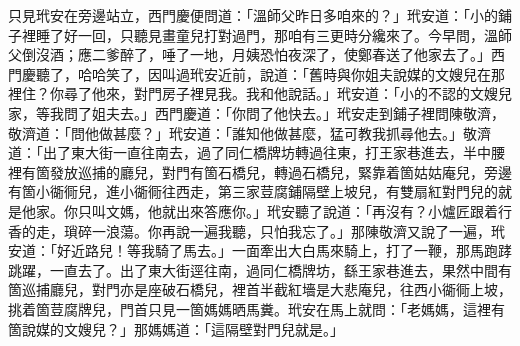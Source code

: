 只見玳安在旁邊站立，西門慶便問道：「溫師父昨日多咱來的？」玳安道：「小的鋪子裡睡了好一回，只聽見畫童兒打對過門，那咱有三更時分纔來了。今早問，溫師父倒沒酒；應二爹醉了，唾了一地，月姨恐怕夜深了，使鄭春送了他家去了。」西門慶聽了，哈哈笑了，因叫過玳安近前，說道：「舊時與你姐夫說媒的文嫂兒在那裡住？你尋了他來，對門房子裡見我。我和他說話。」玳安道：「小的不認的文嫂兒家，等我問了姐夫去。」西門慶道：「你問了他快去。」玳安走到鋪子裡問陳敬濟，敬濟道：「問他做甚麼？」玳安道：「誰知他做甚麼，猛可教我抓尋他去。」{}敬濟道：「出了東大街一直往南去，過了同仁橋牌坊轉過往東，打王家巷進去，半中腰裡有箇發放巡捕的廳兒，對門有箇石橋兒，轉過石橋兒，緊靠着箇姑姑庵兒，旁邊有箇小衚衕兒，進小衚衕往西走，第三家荳腐鋪隔壁上坡兒，有雙扇紅對門兒的就是他家。你只叫文媽，他就出來答應你。」玳安聽了說道：「再沒有？小爐匠跟着行香的走，瑣碎一浪蕩。你再說一遍我聽，{}只怕我忘了。」那陳敬濟又說了一遍，玳安道：「好近路兒！等我騎了馬去。」一面牽出大白馬來騎上，打了一鞭，那馬跑踍跳躍，一直去了。出了東大街逕往南，過同仁橋牌坊，繇王家巷進去，果然中間有箇巡捕廳兒，對門亦是座破石橋兒，裡首半截紅墻是大悲庵兒，往西小衚衕上坡，挑着箇荳腐牌兒，門首只見一箇媽媽晒馬糞。玳安在馬上就問：「老媽媽，這裡有箇說媒的文嫂兒？」那媽媽道：「這隔壁對門兒就是。」

